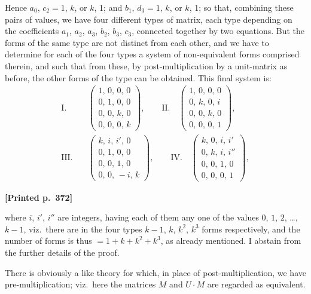 \documentclass[11pt]{article}
\begin{document}
Hence $a_{0}$, $c_{2}=1$, $k$, or $k$, 1; and $b_{1}$, $d_{3}=1$, $k$, or $k$, 1; so that, combining these pairs of values, we have four different types of matrix, each type depending on the coefficients $a_{1}$, $a_{2}$, $a_{3}$, $b_{2}$, $b_{3}$, $c_{3}$, connected together by two equations. But the forms of the same type are not distinct from each other, and we have to determine for each of the four types a system of non-equivalent forms comprised therein, and such that from these, by post-multiplication by a unit-matrix as before, the other forms of the type can be obtained. This final system is:
\begin{align*}
\text{I.}\quad &\begin{pmatrix}1,\,0,\,0,\,0\\ 0,\,1,\,0,\,0\\ 0,\,0,\,k,\,0\\ 0,\,0,\,0,\,k\end{pmatrix},\qquad
\text{II.}\quad \begin{pmatrix}1,\,0,\,0,\,0\\ 0,\,k,\,0,\,i\\ 0,\,0,\,k,\,0\\ 0,\,0,\,0,\,1\end{pmatrix},\\[6pt]
\text{III.}\quad &\begin{pmatrix}k,\,i,\,i',\,0\\ 0,\,1,\,0,\,0\\ 0,\,0,\,1,\,0\\ 0,\,0,\,-i,\,k\end{pmatrix},\qquad
\text{IV.}\quad \begin{pmatrix}k,\,0,\,i,\,i'\\ 0,\,k,\,i,\,i''\\ 0,\,0,\,1,\,0\\ 0,\,0,\,0,\,1\end{pmatrix},
\end{align*}

\medskip
\noindent\textbf{[Printed p.~372]}\hfill

\medskip
where $i$, $i'$, $i''$ are integers, having each of them any one of the values $0$, $1$, $2$, \ldots, $k-1$, viz.\ there are in the four types $k-1$, $k$, $k^{2}$, $k^{3}$ forms respectively, and the number of forms is thus $=1+k+k^{2}+k^{3}$, as already mentioned. I abstain from the further details of the proof.

There is obviously a like theory for which, in place of post-multiplication, we have pre-multiplication; viz.\ here the matrices $M$ and $U\cdot M$ are regarded as equivalent.
\end{document}
